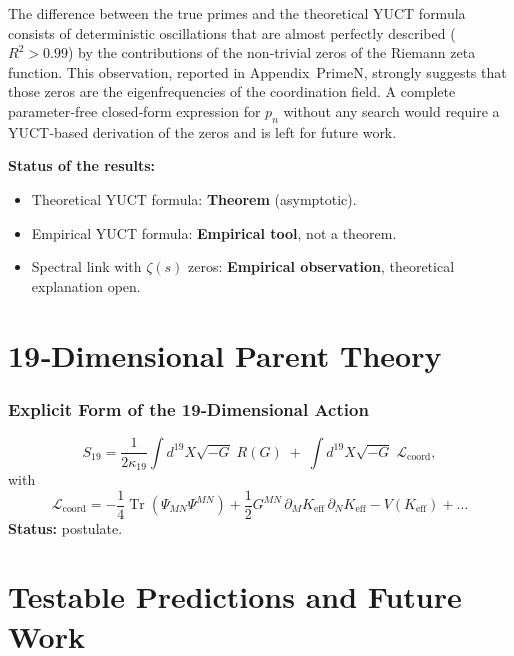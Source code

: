 \documentclass[12pt,a4paper]{article}
\DeclareMathOperator{\Tr}{Tr}
\begin{document}
	The difference between the true primes and the theoretical YUCT formula consists of deterministic oscillations that are almost perfectly described (\(R^2>0.99\)) by the contributions of the non‑trivial zeros of the Riemann zeta function.  This observation, reported in Appendix~PrimeN, strongly suggests that those zeros are the eigenfrequencies of the coordination field.  A complete parameter‑free closed‑form expression for \(p_n\) without any search would require a YUCT‑based derivation of the zeros and is left for future work.
	
	\textbf{Status of the results:}
	\begin{itemize}
		\item Theoretical YUCT formula: \textbf{Theorem} (asymptotic).
		\item Empirical YUCT formula: \textbf{Empirical tool}, not a theorem.
		\item Spectral link with \(\zeta(s)\) zeros: \textbf{Empirical observation}, theoretical explanation open.
	\end{itemize}
	
	\part{19‑Dimensional Parent Theory}
	
	\section{Explicit Form of the 19‑Dimensional Action}
	\label{sec:19Dlagrangian}
	\[
	S_{19} = \frac{1}{2\kappa_{19}} \int d^{19}X \sqrt{-G}\; R(G) \;+\; \int d^{19}X \sqrt{-G}\; \mathcal{L}_{\text{coord}},
	\]
	with
	\[
	\mathcal{L}_{\text{coord}} = -\frac{1}{4} \Tr(\Psi_{MN}\Psi^{MN}) + \frac{1}{2} G^{MN}\,\partial_M K_{\mathrm{eff}}\,\partial_N K_{\mathrm{eff}} - V(K_{\mathrm{eff}}) + \dots
	\]
	\textbf{Status:} postulate.
	
	\part{Testable Predictions and Future Work}
	
\end{document}
